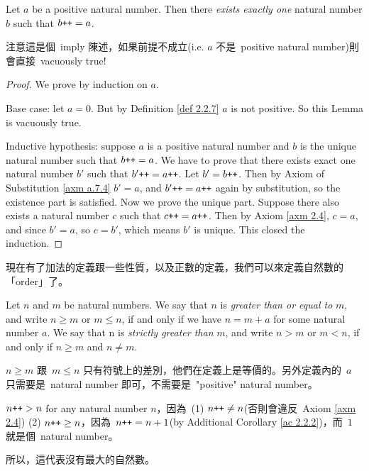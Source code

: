 \begin{lemma}\label{lem 2.2.10}
Let \(a\) be a positive natural number. Then there \emph{exists exactly one} natural number \(b\) such that \(b\texttt{++} = a\).
\end{lemma}
\begin{note}
注意這是個\ imply 陳述，如果前提不成立(i.e. \(a\) 不是\ positive natural number)則會直接\ vacuously true!
\end{note}
\begin{proof}
We prove by induction on \(a\).

Base case: let \(a = 0\). But by Definition \ref{def 2.2.7} \(a\) is not positive. So this Lemma is vacuously true.

Inductive hypothesis: suppose \(a\) is a positive natural number and \(b\) is the unique natural number such that \(b\texttt{++} = a\). We have to prove that there exists exact one natural number \(b'\) such that \(b'\texttt{++} = a\texttt{++}\). Let \(b' = b\texttt{++}\). Then by Axiom of Substitution \ref{axm a.7.4} \(b' = a\), and \(b'\texttt{++} = a\texttt{++}\) again by substitution, so the existence part is satisfied. Now we prove the unique part. Suppose there also exists a natural number \(c\) such that \(c\texttt{++} = a\texttt{++}\). Then by Axiom \ref{axm 2.4}, \(c = a\), and since \(b' = a\), so \(c = b'\), which means \(b'\) is unique. This closed the induction.
\end{proof}

\begin{note}
現在有了加法的定義跟一些性質，以及正數的定義，我們可以來定義自然數的「order」了。
\end{note}

\begin{definition} \label{def 2.2.11} Let \(n\) and \(m\) be natural numbers. We say that \(n\) is \emph{greater than or equal to} \(m\), and write \(n \geq m\) or \(m \leq n\), if and only if we have \(n = m + a\) for some natural number \(a\). We say that n is \emph{strictly greater than} \(m\), and write \(n > m\) or \(m < n\), if and only if \(n \geq m\) and \(n \neq m\).
\end{definition}
\begin{note}
\(n \geq m\) 跟\ \(m \leq n\) 只有符號上的差別，他們在定義上是等價的。另外定義內的\ \(a\) 只需要是\ natural number 即可，不需要是\ "positive" natural number。
\end{note}
\begin{note}
\(n\texttt{++} > n\) for any natural number \(n\)，因為\ (1) \(n\texttt{++} \neq n\)(否則會違反\ Axiom \ref{axm 2.4}) (2) \(n\texttt{++} \geq n\)，因為\ \(n\texttt{++} = n + 1\)(by Additional Corollary \ref{ac 2.2.2})，而\ \(1\) 就是個\ natural number。

所以，這代表沒有最大的自然數。
\end{note}

